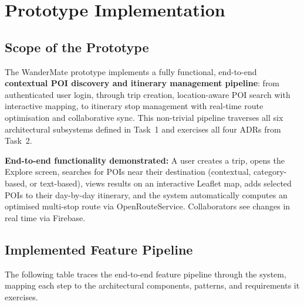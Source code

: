 \documentclass[12pt, a4paper]{article}
\begin{document}
\section{Prototype Implementation}

\subsection{Scope of the Prototype}

The WanderMate prototype implements a fully functional, end-to-end \textbf{contextual POI discovery and itinerary management pipeline}: from authenticated user login, through trip creation, location-aware POI search with interactive mapping, to itinerary stop management with real-time route optimisation and collaborative sync. This non-trivial pipeline traverses all six architectural subsystems defined in Task~1 and exercises all four ADRs from Task~2.

\begin{tcolorbox}[notebox]
  \textbf{End-to-end functionality demonstrated:} A user creates a trip, opens the Explore screen, searches for POIs near their destination (contextual, category-based, or text-based), views results on an interactive Leaflet map, adds selected POIs to their day-by-day itinerary, and the system automatically computes an optimised multi-stop route via OpenRouteService. Collaborators see changes in real time via Firebase.
\end{tcolorbox}

\subsection{Implemented Feature Pipeline}

The following table traces the end-to-end feature pipeline through the system, mapping each step to the architectural components, patterns, and requirements it exercises.
\end{document}
